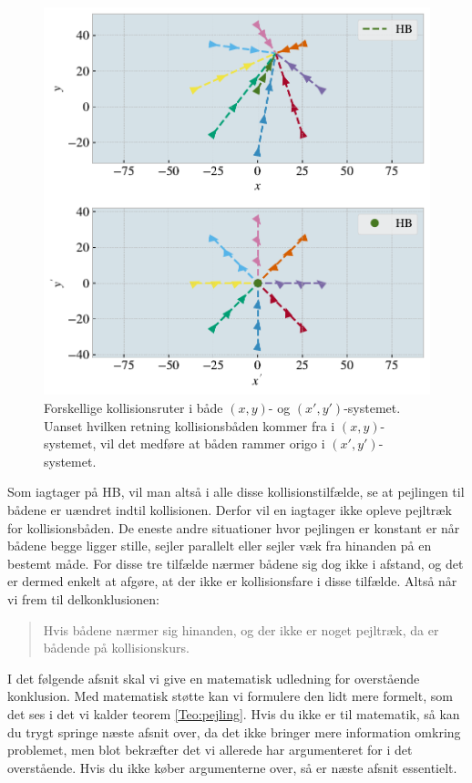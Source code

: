 \documentclass[%
 reprint,
nofootinbib,
aps,
]{revtex4-1}
\begin{document}
\begin{figure}[H]
  \includegraphics[width=\linewidth]{figures/reference_frame_explainer2.pdf}
  \caption{Forskellige kollisionsruter i både $(x,y)$- og $(x',y')$-systemet. Uanset hvilken retning kollisionsbåden kommer fra i $(x,y)$-systemet, vil det medføre at båden rammer origo i $(x',y')$-systemet.}
  \label{fig:reference_frame_explainer2}
\end{figure}

Som iagtager på HB, vil man altså i alle disse kollisionstilfælde, se at pejlingen til bådene er uændret indtil kollisionen. Derfor vil en iagtager ikke opleve pejltræk for kollisionsbåden. De eneste andre situationer hvor pejlingen er konstant er når bådene begge ligger stille, sejler parallelt eller sejler væk fra hinanden på en bestemt måde. For disse tre tilfælde nærmer bådene sig dog ikke i afstand, og det er dermed enkelt at afgøre, at der ikke er kollisionsfare i disse tilfælde. Altså når vi frem til delkonklusionen:

\begin{quote}
Hvis bådene nærmer sig hinanden, og der ikke er noget pejltræk, da er bådende på kollisionskurs.
\end{quote}

I det følgende afsnit skal vi give en matematisk udledning for overstående konklusion. Med matematisk støtte kan vi formulere den lidt mere formelt, som det ses i det vi kalder teorem \ref{Teo:pejling}. Hvis du ikke er til matematik, så kan du trygt springe næste afsnit over, da det ikke bringer mere information omkring problemet, men blot bekræfter det vi allerede har argumenteret for i det overstående. Hvis du ikke køber argumenterne over, så er næste afsnit essentielt.
\end{document}
